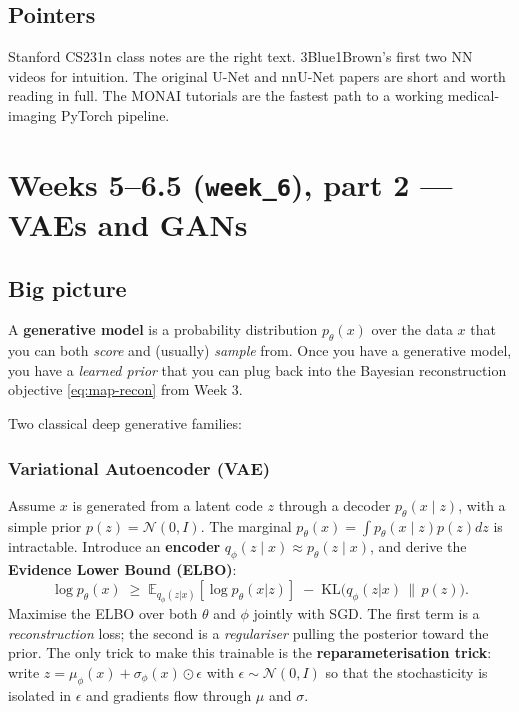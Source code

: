 \documentclass[11pt,a4paper]{article}
\newcommand{\E}{\mathbb{E}}
\newcommand{\KL}{\mathrm{KL}}
\begin{document}
\subsection{Pointers}

Stanford CS231n class notes are the right text. 3Blue1Brown's first
two NN videos for intuition. The original U-Net and nnU-Net papers
are short and worth reading in full. The MONAI tutorials are the
fastest path to a working medical-imaging PyTorch pipeline.

\section{Weeks 5--6.5 (\texttt{week\_6}), part 2 --- VAEs and GANs}

\subsection{Big picture}

A \textbf{generative model} is a probability distribution
$p_\theta(x)$ over the data $x$ that you can both \emph{score} and
(usually) \emph{sample} from. Once you have a generative model, you
have a \emph{learned prior} that you can plug back into the
Bayesian reconstruction objective \eqref{eq:map-recon} from Week 3.

Two classical deep generative families:

\subsubsection{Variational Autoencoder (VAE)}

Assume $x$ is generated from a latent code $z$ through a decoder
$p_\theta(x \mid z)$, with a simple prior $p(z) = \mathcal{N}(0,I)$.
The marginal $p_\theta(x) = \int p_\theta(x \mid z) p(z) dz$ is
intractable. Introduce an \textbf{encoder}
$q_\phi(z \mid x) \approx p_\theta(z \mid x)$, and derive the
\textbf{Evidence Lower Bound (ELBO)}:
\begin{equation}
  \log p_\theta(x) \;\ge\; \E_{q_\phi(z|x)}[\log p_\theta(x|z)] \;-\; \KL\big(q_\phi(z|x) \,\|\, p(z)\big).
  \label{eq:elbo}
\end{equation}
Maximise the ELBO over both $\theta$ and $\phi$ jointly with SGD.
The first term is a \emph{reconstruction} loss; the second is a
\emph{regulariser} pulling the posterior toward the prior. The only
trick to make this trainable is the
\textbf{reparameterisation trick}: write
$z = \mu_\phi(x) + \sigma_\phi(x) \odot \epsilon$ with
$\epsilon \sim \mathcal{N}(0,I)$ so that the stochasticity is
isolated in $\epsilon$ and gradients flow through $\mu$ and
$\sigma$.
\end{document}
